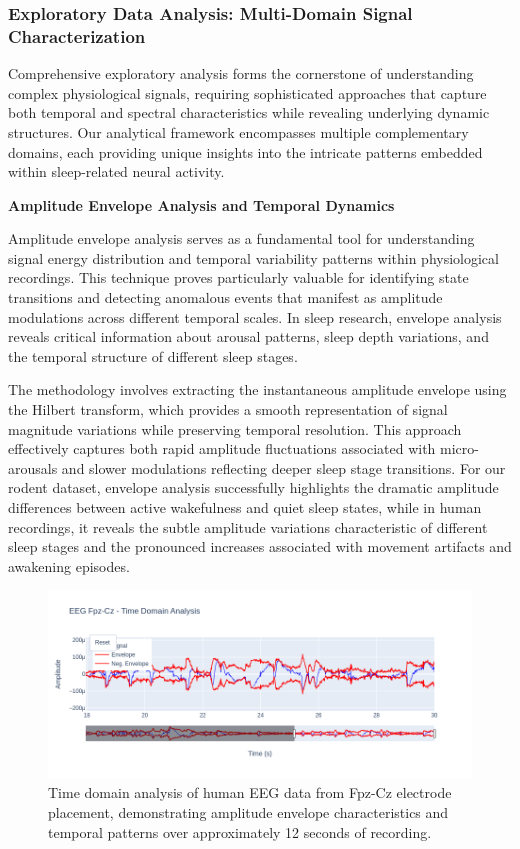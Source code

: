 \documentclass[a4paper,12pt,twoside]{article}
\begin{document}
\subsubsection{Exploratory Data Analysis: Multi-Domain Signal Characterization}

Comprehensive exploratory analysis forms the cornerstone of understanding complex physiological signals, requiring sophisticated approaches that capture both temporal and spectral characteristics while revealing underlying dynamic structures. Our analytical framework encompasses multiple complementary domains, each providing unique insights into the intricate patterns embedded within sleep-related neural activity.

\textbf{Amplitude Envelope Analysis and Temporal Dynamics}

Amplitude envelope analysis serves as a fundamental tool for understanding signal energy distribution and temporal variability patterns within physiological recordings. This technique proves particularly valuable for identifying state transitions and detecting anomalous events that manifest as amplitude modulations across different temporal scales. In sleep research, envelope analysis reveals critical information about arousal patterns, sleep depth variations, and the temporal structure of different sleep stages.

The methodology involves extracting the instantaneous amplitude envelope using the Hilbert transform, which provides a smooth representation of signal magnitude variations while preserving temporal resolution. This approach effectively captures both rapid amplitude fluctuations associated with micro-arousals and slower modulations reflecting deeper sleep stage transitions. For our rodent dataset, envelope analysis successfully highlights the dramatic amplitude differences between active wakefulness and quiet sleep states, while in human recordings, it reveals the subtle amplitude variations characteristic of different sleep stages and the pronounced increases associated with movement artifacts and awakening episodes.

\begin{figure}[h]
  \centering
  \includegraphics[width=0.9\linewidth]{img/eeg fpz cz time domain analysis}
  \caption{Time domain analysis of human EEG data from Fpz-Cz electrode placement, demonstrating amplitude envelope characteristics and temporal patterns over approximately 12 seconds of recording.}
  \label{fig:eeg_fpz_cz_time_domain}
\end{figure}
\end{document}
